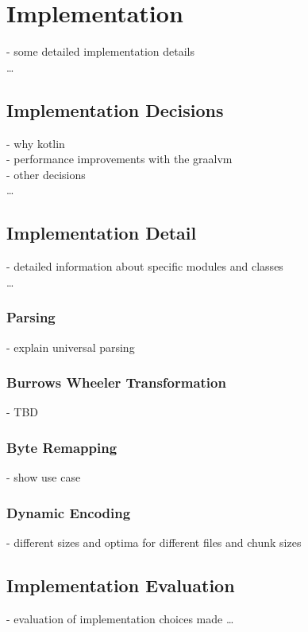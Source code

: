 
\chapter{Implementation}
\label{ch:Implementation}
- some detailed implementation details\\
\ldots

\section{Implementation Decisions}
\label{ch:Implementation:sec:Implementation Decisions}
- why kotlin\\
- performance improvements with the graalvm\\
- other decisions\\
\ldots

\section{Implementation Detail}
\label{ch:Implementation:sec:Implementation Detail}
- detailed information about specific modules and classes\\
\ldots


\subsection{Parsing}
- explain universal parsing\\
\subsection{Burrows Wheeler Transformation}
- TBD\\
\subsection{Byte Remapping}
- show use case \\
\subsection{Dynamic Encoding}
- different sizes and optima for different files and chunk sizes \\


\section{Implementation Evaluation}
\label{ch:Implementation:sec:Implementation Evaluation}
- evaluation of implementation choices made
\ldots
